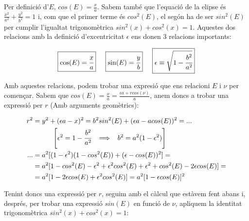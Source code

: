 \documentclass[a4paper, 11pt]{article}
\begin{document}
\noindent Per definició d'$E$, $cos(E) = \frac{x}{a}$. Sabem també que l'equació de la elipse és $\frac{x^2}{a^2} + \frac{y^2}{b^2} = 1$ i, com que el primer terme és $cos^2(E)$, el segón ha de ser $sin^2(E)$ per cumplir l'igualtat trigonomètrica $sin^2(x) + cos^2(x) = 1$. Aquestes dos relacions amb la definició d'excentricitat $\epsilon$ ens donen 3 relacions importants:

\begin{equation} \label{relacions_Eie}
    \boxed{\cos(E) = \cfrac{x}{a}} \hspace{5mm} \boxed{\sin(E) = \cfrac{y}{b}} \hspace{5mm} \boxed{\epsilon \equiv \sqrt{1-\cfrac{b^2}{a^2}}}
\end{equation}
\vspace{2mm}

\noindent Amb aquestes relacions, podem trobar una expresió que ens relacioni $E$ i $\nu$ per començar. Sabem que $cos(E) = \frac{x}{a} = \frac{\epsilon a + rcos(\nu)}{a}$, anem doncs a trobar una expressió per $r$ (Amb arguments geomètrics):

\begin{align*}
    r^2 &= y^2 + (\epsilon a - x)^2 = b^2 sin ^2(E) + (\epsilon a - acos(E))^2 = ...\\
    & \hspace{10mm} \left[ \epsilon ^2 = 1- \cfrac{b^2}{a^2} \hspace{2mm} \implies \hspace{2mm} b^2 = a^2 (1-\epsilon^2) \right] \\
    ... &= a^2 [(1-\epsilon^2)(1-cos^2(E)) + (\epsilon - cos(E))^2] = \\
    &= a^2 [1 - cos^2(E) -\epsilon ^2 + \epsilon ^2 cos^2(E) + \epsilon^2 + cos^2(E) -2\epsilon cos(E)] = \\
    &= a^2 [1 - 2\epsilon cos(E) + \epsilon^2 cos^2(E)] = a^2[1-\epsilon cos(E)]^2
\end{align*}

\noindent Tenint doncs una expressió per $r$, seguim amb el càlcul que estàvem fent abans i, després, per trobar una expressió $sin(E)$ en funció de $\nu$, apliquem la identitat trigonomètrica $sin^2(x) + cos^2(x) = 1$:
\end{document}
